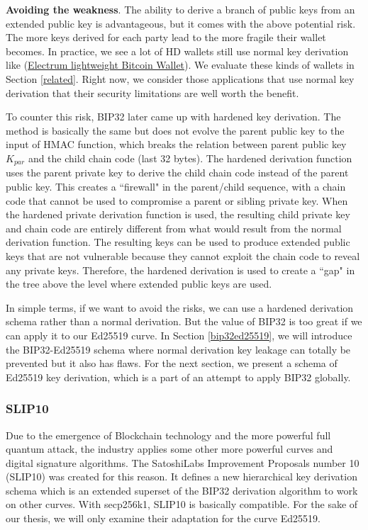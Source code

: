     \bigskip
    {\textbf{Avoiding the weakness}}. The ability to derive a branch of public keys from an extended public key is advantageous, but it comes with the above potential risk. The more keys derived for each party lead to the more fragile their wallet becomes. In practice, we see a lot of HD wallets still use normal key derivation like (\href{https://electrum.org/#home}{Electrum lightweight Bitcoin Wallet}). We evaluate these kinds of wallets in Section \ref{related}. Right now, we consider those applications that use normal key derivation that their security limitations are well worth the benefit.

    To counter this risk, BIP32 later came up with hardened key derivation. The method is basically the same but does not evolve the parent public key to the input of HMAC function, which breaks the relation between parent public key $K_{par}$ and the child chain code (last 32 bytes). The hardened derivation function uses the parent private key to derive the child chain code instead of the parent public key. This creates a ``firewall" in the parent/child sequence, with a chain code that cannot be used to compromise a parent or sibling private key. When the hardened private derivation function is used, the resulting child private key and chain code are entirely different from what would result from the normal derivation function. The resulting keys can be used to produce extended public keys that are not vulnerable because they cannot exploit the chain code to reveal any private keys. Therefore, the hardened derivation is used to create a ``gap" in the tree above the level where extended public keys are used.

    In simple terms, if we want to avoid the risks, we can use a hardened derivation schema rather than a normal derivation. But the value of BIP32 is too great if we can apply it to our Ed25519 curve. In Section \ref{bip32ed25519}, we will introduce the BIP32-Ed25519 schema where normal derivation key leakage can totally be prevented but it also has flaws. For the next section, we present a schema of Ed25519 key derivation, which is a part of an attempt to apply BIP32 globally.

\subsubsection{SLIP10}
\label{SLIP10}

Due to the emergence of Blockchain technology and the more powerful full quantum attack, the industry applies some other more powerful curves and digital signature algorithms. The SatoshiLabs Improvement Proposals number 10 (SLIP10) \cite{github/slip0010} was created for this reason. It defines a new hierarchical key derivation schema which is an extended superset of the BIP32 derivation algorithm to work on other curves. With secp256k1, SLIP10 is basically compatible. For the sake of our thesis, we will only examine their adaptation for the curve Ed25519.


